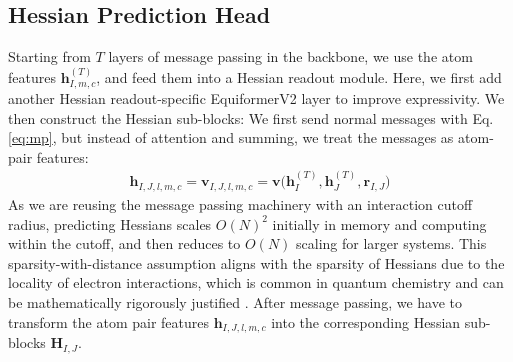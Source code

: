 \documentclass[pdflatex,sn-mathphys-num]{sn-jnl}%
\theoremstyle{thmstyleone}%
\theoremstyle{thmstyletwo}%
\theoremstyle{thmstylethree}%
\begin{document}
\subsection{Hessian Prediction Head}
Starting from $T$ layers of message passing in the backbone, we use the atom features $\mathbf{h}^{(T)}_{I,m,c}$, and feed them into a Hessian readout module. Here, we first add another Hessian readout-specific EquiformerV2 layer to improve expressivity. We then construct the Hessian sub-blocks: We first send normal messages with Eq. \eqref{eq:mp}, but instead of attention and summing, we treat the messages as atom-pair features:
\begin{align}
    \mathbf{h}_{I,J,l,m,c} 
    = \mathbf{v}_{I,J,l,m,c} 
    = \mathbf{v} \big(\mathbf{h}^{(T)}_I, \mathbf{h}^{(T)}_J, \mathbf{r}_{I,J} \big)
\end{align}
As we are reusing the message passing machinery with an interaction cutoff radius, predicting Hessians scales $O(N)^2$ initially in memory and computing within the cutoff, and then reduces to $O(N)$ scaling for larger systems.
This sparsity-with-distance assumption aligns with the sparsity of Hessians due to the locality of electron interactions, which is common in quantum chemistry and can be mathematically rigorously justified \citep{kussmann2015reduced}.
After message passing, we have to transform the atom pair features $\mathbf{h}_{I,J,l,m,c}$ into the corresponding Hessian sub-blocks $\mathbf{H}_{I,J}$.
\end{document}
